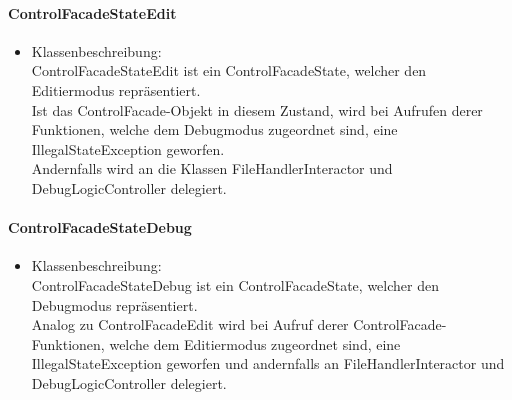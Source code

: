 \documentclass[parskip=full]{scrartcl}
\begin{document}
    \paragraph{ControlFacadeStateEdit}
        \begin{itemize}
            \item Klassenbeschreibung:\\
                ControlFacadeStateEdit ist ein ControlFacadeState, welcher den Editiermodus 
                repräsentiert.\\
                Ist das ControlFacade-Objekt in diesem Zustand, wird bei Aufrufen derer Funktionen,
                welche dem Debugmodus zugeordnet sind, eine IllegalStateException geworfen.\\
                Andernfalls wird an die Klassen FileHandlerInteractor und DebugLogicController 
                delegiert.
        \end{itemize}

    \paragraph{ControlFacadeStateDebug}
        \begin{itemize}
            \item Klassenbeschreibung:\\
                ControlFacadeStateDebug ist ein ControlFacadeState, welcher den Debugmodus 
                repräsentiert.\\
                Analog zu ControlFacadeEdit wird bei Aufruf derer ControlFacade-Funktionen,
                welche dem Editiermodus zugeordnet sind, eine IllegalStateException geworfen
                und andernfalls an FileHandlerInteractor und DebugLogicController delegiert.\\
        \end{itemize}
                
\end{document}
